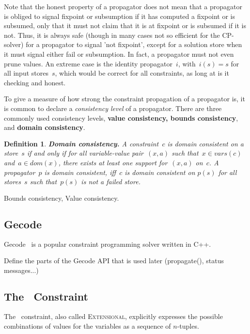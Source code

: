 \documentclass[a4paper,11pt]{article}
\newtheorem{definition}{Definition}
\newcommand{\Todo}[1]{{\color{blue}#1}}
\newcommand{\Table}{\Constraint{Table}~}
\newcommand{\Extensional}{\Constraint{Extensional}~}
\def\Extensional{\textsc{Extensional}}
\numberwithin{equation}{section}
\begin{document}
Note that the honest property of a propagator does not mean that a
propagator is obliged to signal fixpoint or subsumption
if it has computed a fixpoint or is subsumed, only that it must not 
claim that it is at fixpoint or is subsumed if it is not. 
Thus, it is always safe 
(though in many cases not so efficient for the CP-solver)
for a propagator to signal 'not fixpoint', except for a solution store
when it must signal either fail or subsumption.
In fact, a propagator must not even prune values. An extreme case is
the identity propagator~$i$, with~$i(s) = s$ for all input stores~$s$,
which would be correct
for all constraints, as long at is it checking and honest.

To give a measure of how strong the constraint propagation of a propagator
is, it is common to declare a \emph{consistency level} of a propagator.
There are three commonly used consistency levels,
\textbf{value consistency, bounds consistency}, and \textbf{domain consistency}.

\begin{definition}
  \textbf{Domain consistency.} A constraint~$c$ is domain consistent on a store~$s$ 
  if and only if for all variable-value
  pair~$(x,a)$ such that~$x \in vars(c)$ and~$a \in dom(x)$, there exists
  at least one support for~$(x,a)$ on~$c$. 
  A propagator~$p$ is domain consistent, iff~$c$ is domain 
  consistent on $p(s)$ for all stores~$s$ such that~$p(s)$ is not a failed store.
\end{definition}

\Todo{Bounds consistency, Value consistency}.

\subsection{Gecode}
\label{bg:gecode}
Gecode~\cite{Gecode} is a popular constraint programming solver written in C++.

\Todo{Define the parts of the Gecode API that is used later (propagate(), status
  messages...)}



\subsection{The \Table Constraint}
\label{bg:table}
The \Table constraint, also called \Extensional,
explicitly expresses the possible combinations of values for the variables as a
sequence of $n$-tuples.
\end{document}
